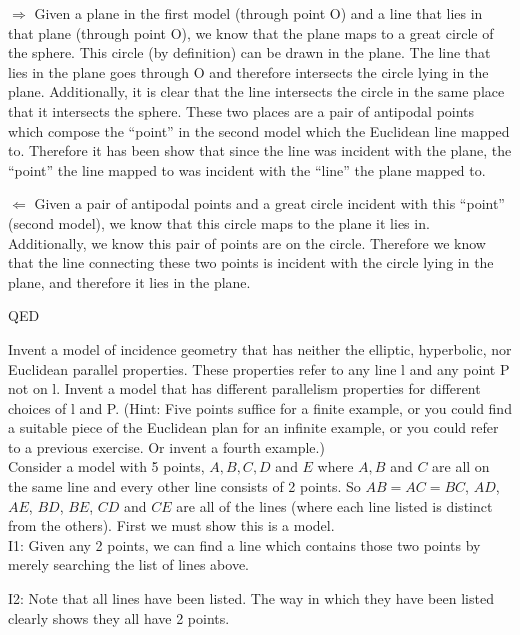 \documentclass[12pt,letterpaper]{article}
\newcommand{\QED}{\begin{flushright}QED\end{flushright}}
\newcommand{\prob}[1]{\newpage\noindent {\bf #1}}
\begin{document}
\newpage 

$\Rightarrow$
Given a plane in the first model (through point O) and a line that lies in that plane (through point O), we know that the plane maps to a great circle of the sphere.  This circle (by definition) can be drawn in the plane.  The line that lies in the plane goes through O and therefore intersects the circle lying in the plane.  Additionally, it is clear that the line intersects the circle in the same place that it intersects the sphere.  These two places are a pair of antipodal points which compose the ``point'' in the second model which the Euclidean line mapped to.  Therefore it has been show that since the line was incident with the plane, the ``point'' the line mapped to was incident with the ``line'' the plane mapped to.

$\Leftarrow$
Given a pair of antipodal points and a great circle incident with this ``point'' (second model), we know that this circle maps to the plane it lies in.  Additionally, we know this pair of points are on the circle.  Therefore we know that the line connecting these two points is incident with the circle lying in the plane, and therefore it lies in the plane.


\QED





\prob{11} Invent a model of incidence geometry that has neither the elliptic, hyperbolic, nor Euclidean parallel properties. These properties refer to any line l and any point P not on l.  Invent a model that has different parallelism properties for different choices of l and P.  (Hint:  Five points suffice for a finite example, or you could find a suitable piece of the Euclidean plan for an infinite example, or you could refer to a previous exercise.  Or invent a fourth example.)\\



Consider a model with 5 points, $A,B,C,D$ and $E$ where $A,B$ and $C$ are all on the same line and every other line consists of 2 points.  So $AB = AC = BC$, $AD$, $AE$, $BD$, $BE$, $CD$ and $CE$ are all of the lines (where each line listed is distinct from the others). First we must show this is a model.  \\

\noindent I1: Given any 2 points, we can find a line which contains those two points by merely searching the list of lines above. 

\noindent I2: Note that all lines have been listed.  The way in which they have been listed clearly shows they all have 2 points.
\end{document}
